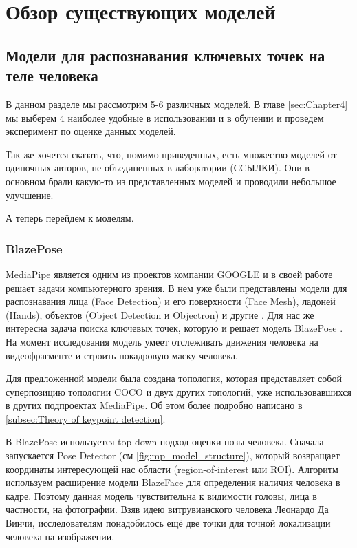 \section{Обзор существующих моделей}
\label{sec:Chapter2} 

\subsection{Модели для распознавания ключевых точек на теле человека}

В данном разделе мы рассмотрим 5-6 различных моделей. В главе \ref{sec:Chapter4} мы выберем 4 наиболее удобные в использовании и в обучении и проведем эксперимент по оценке данных моделей.

Так же хочется сказать, что, помимо приведенных, есть множество моделей от одиночных авторов, не объединенных в лаборатории (ССЫЛКИ). Они в основном брали какую-то из представленных моделей и проводили небольшое улучшение.

А теперь перейдем к моделям.

\subsubsection{BlazePose}

MediaPipe является одним из проектов компании GOOGLE и в своей работе решает задачи компьютерного зрения. В нем уже были представлены модели для распознавания лица (Face Detection) и его поверхности (Face Mesh), ладоней (Hands), объектов (Object Detection и Objectron) и другие \cite{mediapipe}. Для нас же интересна задача поиска ключевых точек, которую и решает модель BlazePose \cite{BlazePose}. На момент исследования модель умеет отслеживать движения человека на видеофрагменте и строить покадровую маску человека.

Для предложенной модели была создана топология, которая представляет собой суперпозицию топологии COCO и двух других топологий, уже использовавшихся в других подпроектах MediaPipe. Об этом более подробно написано в \autoref{subsec:Theory of keypoint detection}.

\hfill \break
В BlazePose используется top-down подход оценки позы человека. Сначала запускается Pose Detector (см \autoref{fig:mp_model_structure}), который возвращает координаты интересующей нас области (region-of-interest или ROI). Алгоритм используем расширение модели BlazeFace для определения наличия человека в кадре. Поэтому данная модель чувствительна к видимости головы, лица в частности, на фотографии. Взяв идею витрувианского человека Леонардо Да Винчи, исследователям понадобилось ещё две точки для точной локализации человека на изображении.

